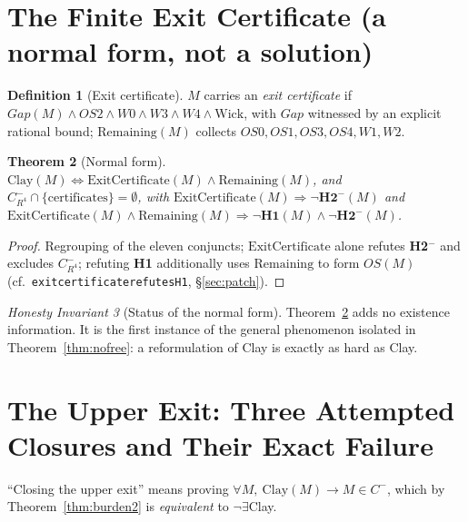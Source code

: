 \documentclass[11pt,a4paper]{article}
\def\R{R}\def\N{N}\def\Q{Q}\def\Z{Z}\def\Class{C}\def\OS{OS}\def\Gap{Gap}%
\theoremstyle{plain}
\newtheorem{theorem}{Theorem}[section]
\theoremstyle{definition}
\newtheorem{definition}[theorem]{Definition}
\theoremstyle{remark}
\newtheorem{invariant}[theorem]{Honesty Invariant}
\newcommand{\R}{\mathbb{R}}\newcommand{\N}{\mathbb{N}}\newcommand{\Q}{\mathbb{Q}}
\newcommand{\Z}{\mathbb{Z}}\newcommand{\Spec}{\operatorname{Spec}}
\newcommand{\OS}{\mathrm{OS}}\newcommand{\Gap}{\mathrm{Gap}}
\newcommand{\Class}{\mathcal{C}}\newcommand{\Htot}{\mathcal{H}}
\renewcommand{\_}{\oldunderscore\allowbreak}
\newcommand{\Lean}[1]{\texttt{\small #1}}
\begin{document}
\section{The Finite Exit Certificate (a normal form, not a solution)}\label{sec:exit}
\begin{definition}[Exit certificate]\label{def:exit}
$M$ carries an \emph{exit certificate} if
$\Gap(M)\wedge\OS2\wedge W0\wedge W3\wedge W4\wedge\mathrm{Wick}$, with $\Gap$ witnessed by an
explicit rational bound; $\mathrm{Remaining}(M)$ collects $\OS0,\OS1,\OS3,\OS4,W1,W2$.
\end{definition}
\begin{theorem}[Normal form]\label{thm:normalform}
$\mathrm{Clay}(M)\iff\mathrm{ExitCertificate}(M)\wedge\mathrm{Remaining}(M)$, and
$\Class^-_{\R^4}\cap\{\text{certificates}\}=\emptyset$, with
$\mathrm{ExitCertificate}(M)\Rightarrow\neg\textbf{H2}^-(M)$ and
$\mathrm{ExitCertificate}(M)\wedge\mathrm{Remaining}(M)\Rightarrow\neg\textbf{H1}(M)\wedge\neg\textbf{H2}^-(M)$.
\end{theorem}
\begin{proof}
Regrouping of the eleven conjuncts; $\mathrm{ExitCertificate}$ alone refutes \textbf{H2$^-$} and excludes $\Class^-_{\R^4}$; refuting \textbf{H1} additionally uses $\mathrm{Remaining}$ to form $\OS(M)$ (cf.\ \Lean{exit\_certificate\_refutes\_H1}, \S\ref{sec:patch}).
\end{proof}
\begin{invariant}[Status of the normal form]
Theorem~\ref{thm:normalform} adds no existence information. It is the first instance of the
general phenomenon isolated in Theorem~\ref{thm:nofree}: a reformulation of Clay is exactly as
hard as Clay.
\end{invariant}
\section{The Upper Exit: Three Attempted Closures and Their Exact Failure}\label{sec:upper}
``Closing the upper exit'' means proving $\forall M,\ \mathrm{Clay}(M)\to M\in\Class^-$, which by
Theorem~\ref{thm:burden2} is \emph{equivalent} to $\neg\exists$Clay.
\end{document}
